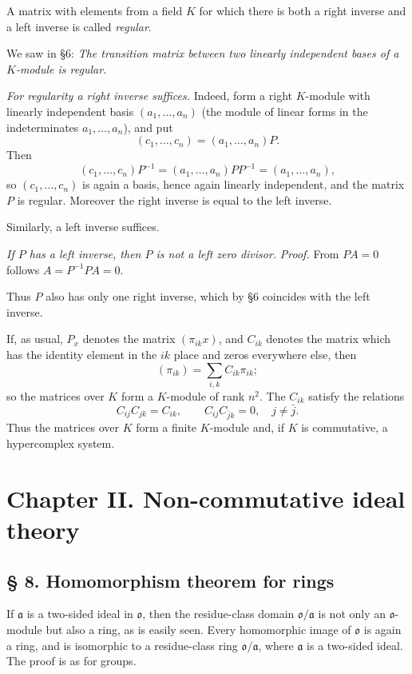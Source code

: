 \documentclass[11pt]{article}
\providecommand{\mo}{\mathfrak{o}}
\providecommand{\ma}{\mathfrak{a}}
\begin{document}
A matrix with elements from a field $K$ for which there is both a right inverse and a left inverse is called \emph{regular}.

We saw in §6: \emph{The transition matrix between two linearly independent bases of a $K$-module is regular.}

\emph{For regularity a right inverse suffices.} Indeed, form a right $K$-module with linearly independent basis $(a_1,\ldots,a_n)$ (the module of linear forms in the indeterminates $a_1,\ldots,a_n$), and put
\[
        (c_1,\ldots,c_n)=(a_1,\ldots,a_n)P.
\]
Then
\[
        (c_1,\ldots,c_n)P^{-1}=(a_1,\ldots,a_n)PP^{-1}=(a_1,\ldots,a_n),
\]
so $(c_1,\ldots,c_n)$ is again a basis, hence again linearly independent, and the matrix $P$ is regular. Moreover the right inverse is equal to the left inverse.

Similarly, a left inverse suffices.

\emph{If $P$ has a left inverse, then $P$ is not a left zero divisor.}
\emph{Proof.} From $PA=0$ follows $A=P^{-1}PA=0$.

Thus $P$ also has only one right inverse, which by §6 coincides with the left inverse.

If, as usual, $P_x$ denotes the matrix $(\pi_{ik}x)$, and $C_{ik}$ denotes the matrix which has the identity element in the $ik$ place and zeros everywhere else, then
\[
        (\pi_{ik})=\sum_{i,k} C_{ik}\pi_{ik};
\]
so the matrices over $K$ form a $K$-module of rank $n^2$. The $C_{ik}$ satisfy the relations
\[
        C_{ij}C_{jk}=C_{ik},
        \qquad
        C_{ij}C_{\bar j k}=0,\quad j\ne\bar j.
\]
Thus the matrices over $K$ form a finite $K$-module and, if $K$ is commutative, a hypercomplex system.

\section*{Chapter II. Non-commutative ideal theory}

\subsection*{§ 8. Homomorphism theorem for rings}

If $\ma$ is a two-sided ideal in $\mo$, then the residue-class domain $\mo/\ma$ is not only an $\mo$-module but also a ring, as is easily seen. Every homomorphic image of $\mo$ is again a ring, and is isomorphic to a residue-class ring $\mo/\ma$, where $\ma$ is a two-sided ideal. The proof is as for groups.
\end{document}

